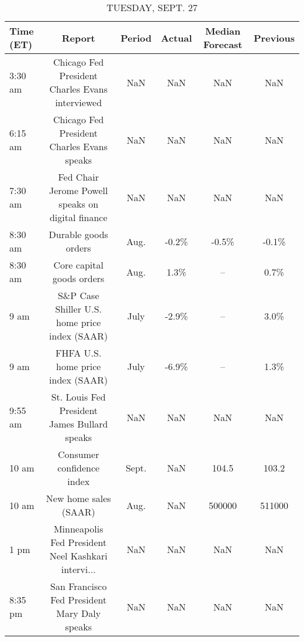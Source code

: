 \documentclass{article}%
\begin{document}
\begin{table}[htbp]%
\caption{TUESDAY, SEPT. 27}%
\centering%
\begin{adjustbox}{width=1\textwidth}%
\begin{tabular}{lccccc}
\toprule
Time (ET) &                                             Report & Period & Actual & Median Forecast & Previous \\
\midrule
  3:30 am &    Chicago Fed President Charles Evans interviewed &    NaN &    NaN &             NaN &      NaN \\
  6:15 am &         Chicago Fed President Charles Evans speaks &    NaN &    NaN &             NaN &      NaN \\
  7:30 am &  Fed Chair Jerome Powell speaks on digital finance &    NaN &    NaN &             NaN &      NaN \\
  8:30 am &                               Durable goods orders &   Aug. &  -0.2\% &           -0.5\% &    -0.1\% \\
  8:30 am &                          Core capital goods orders &   Aug. &   1.3\% &              -- &     0.7\% \\
     9 am &      S\&P Case Shiller U.S. home price index (SAAR) &   July &  -2.9\% &              -- &     3.0\% \\
     9 am &                  FHFA U.S. home price index (SAAR) &   July &  -6.9\% &              -- &     1.3\% \\
  9:55 am &       St. Louis Fed President James Bullard speaks &    NaN &    NaN &             NaN &      NaN \\
    10 am &                          Consumer confidence index &  Sept. &    NaN &           104.5 &    103.2 \\
    10 am &                              New home sales (SAAR) &   Aug. &    NaN &          500000 &   511000 \\
     1 pm & Minneapolis Fed President Neel Kashkari intervi... &    NaN &    NaN &             NaN &      NaN \\
  8:35 pm &       San Francisco Fed President Mary Daly speaks &    NaN &    NaN &             NaN &      NaN \\
\bottomrule
\end{tabular}
%
\end{adjustbox}%
\end{table}

%
\end{document}
